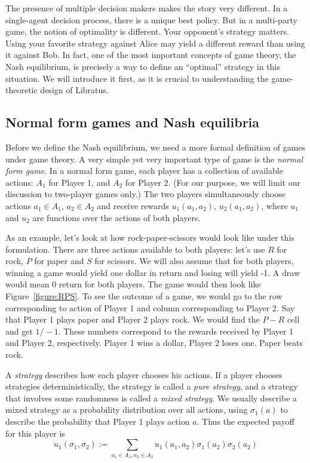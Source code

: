 \documentclass[10pt,a4paper]{article}
\begin{document}
The presence of multiple decision makers makes the story very different. In a single-agent decision process, there is a unique best policy. But in a multi-party game, the notion of optimality is different. Your opponent's strategy matters. Using your favorite strategy against Alice may yield a different reward than using it against Bob. In fact, one of the most important concepts of game theory, the Nash equilibrium, is precisely a way to define an ``optimal'' strategy in this situation. We will introduce it first, as it is crucial to understanding the game-theoretic design of Libratus.

\subsection{Normal form games and Nash equilibria}

Before we define the Nash equilibrium, we need a more formal definition of games under game theory. A very simple yet very important type of game is the \textit{normal form game}. In a normal form game, each player has a collection of available actions: $A_1$ for Player 1, and $A_2$ for Player 2. (For our purpose, we will limit our discussion to two-player games only.) The two players simultaneously choose actions $a_1 \in A_1$, $a_2 \in A_2$ and receive rewards $u_1(a_1, a_2)$, $u_2(a_1, a_2)$, where $u_1$ and $u_2$ are functions over the actions of both players.

As an example, let's look at how rock-paper-scissors would look like under this formulation. There are three actions available to both players: let's use $R$ for rock, $P$ for paper and $S$ for scissors. We will also assume that for both players, winning a game would yield one dollar in return and losing will yield -1. A draw would mean 0 return for both players. The game would then look like Figure~\ref{figure:RPS}. To see the outcome of a game, we would go to the row corresponding to action of Player 1 and column corresponding to Player 2. Say that Player 1 plays paper and Player 2 plays rock. We would find the $P-R$ cell and get $1/-1$. These numbers correspond to the rewards received by Player 1 and Player 2, respectively. Player 1 wins a dollar, Player 2 loses one. Paper beats rock.

A \textit{strategy} describes how each player chooses his actions. If a player chooses strategies deterministically, the strategy is called a \textit{pure strategy}, and a strategy that involves some randomness is called a \textit{mixed strategy}. We usually describe a mixed strategy as a probability distribution over all actions, using $\sigma_1(a)$ to describe the probability that Player 1 plays action $a$. Thus the expected payoff for this player is
$$
	u_1(\sigma_1, \sigma_2) := \sum_{a_1 \in A_1, a_2 \in A_2} u_1(a_1, a_2)\sigma_1(a_2)\sigma_2(a_2)
$$
\end{document}
